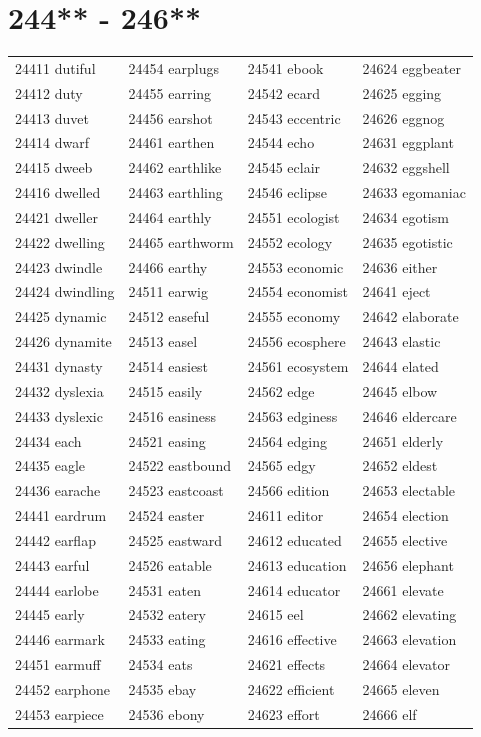 \documentclass[10pt, oneside]{book}
\begin{document}
\begin{table}
	\centering
	\section*{244** - 246**}
	\begin{tabular}{l l l l}
24411 dutiful &24454 earplugs &24541 ebook &24624 eggbeater\\
24412 duty &24455 earring &24542 ecard &24625 egging\\
24413 duvet &24456 earshot &24543 eccentric &24626 eggnog\\
24414 dwarf &24461 earthen &24544 echo &24631 eggplant\\
24415 dweeb &24462 earthlike &24545 eclair &24632 eggshell\\
24416 dwelled &24463 earthling &24546 eclipse &24633 egomaniac\\
24421 dweller &24464 earthly &24551 ecologist &24634 egotism\\
24422 dwelling &24465 earthworm &24552 ecology &24635 egotistic\\
24423 dwindle &24466 earthy &24553 economic &24636 either\\
24424 dwindling &24511 earwig &24554 economist &24641 eject\\
24425 dynamic &24512 easeful &24555 economy &24642 elaborate\\
24426 dynamite &24513 easel &24556 ecosphere &24643 elastic\\
24431 dynasty &24514 easiest &24561 ecosystem &24644 elated\\
24432 dyslexia &24515 easily &24562 edge &24645 elbow\\
24433 dyslexic &24516 easiness &24563 edginess &24646 eldercare\\
24434 each &24521 easing &24564 edging &24651 elderly\\
24435 eagle &24522 eastbound &24565 edgy &24652 eldest\\
24436 earache &24523 eastcoast &24566 edition &24653 electable\\
24441 eardrum &24524 easter &24611 editor &24654 election\\
24442 earflap &24525 eastward &24612 educated &24655 elective\\
24443 earful &24526 eatable &24613 education &24656 elephant\\
24444 earlobe &24531 eaten &24614 educator &24661 elevate\\
24445 early &24532 eatery &24615 eel &24662 elevating\\
24446 earmark &24533 eating &24616 effective &24663 elevation\\
24451 earmuff &24534 eats &24621 effects &24664 elevator\\
24452 earphone &24535 ebay &24622 efficient &24665 eleven\\
24453 earpiece &24536 ebony &24623 effort &24666 elf\\
	\end{tabular}
 \end{table}
\clearpage
\end{document}
